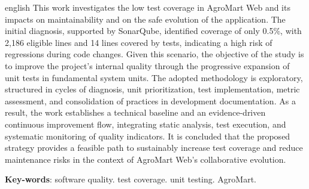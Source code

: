 \begin{resumo}[Abstract]
 \begin{otherlanguage*}{english}
   This work investigates the low test coverage in AgroMart Web and its impacts on maintainability and on the safe evolution of the application.
   The initial diagnosis, supported by SonarQube, identified coverage of only 0.5\%, with 2,186 eligible lines and 14 lines covered by tests,
   indicating a high risk of regressions during code changes. Given this scenario, the objective of the study is to improve the project's internal
   quality through the progressive expansion of unit tests in fundamental system units. The adopted methodology is exploratory, structured in cycles of diagnosis,
   unit prioritization, test implementation, metric assessment, and consolidation of practices in development documentation.
   As a result, the work establishes a technical baseline and an evidence-driven continuous improvement flow, integrating static analysis,
   test execution, and systematic monitoring of quality indicators. It is concluded that the proposed strategy provides a feasible path
   to sustainably increase test coverage and reduce maintenance risks in the context of AgroMart Web's collaborative evolution.

   \vspace{\onelineskip}
 
   \noindent 
   \textbf{Key-words}: software quality. test coverage. unit testing. AgroMart.
 \end{otherlanguage*}
\end{resumo}
